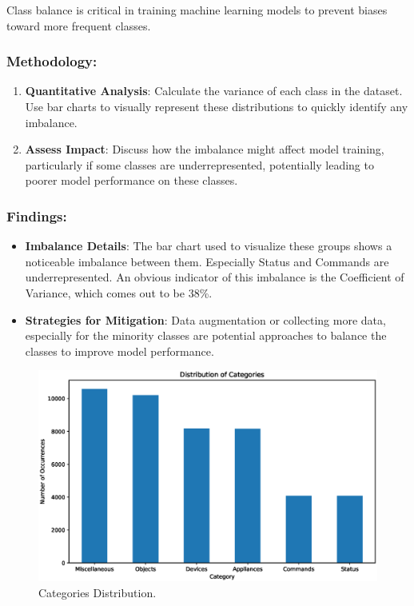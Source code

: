 Class balance is critical in training machine learning models to prevent biases toward more frequent classes.

\subsubsection{Methodology:}

\begin{enumerate}
    \item \textbf{Quantitative Analysis}: Calculate the variance of each class in the dataset. Use bar charts to visually represent these distributions to quickly identify any imbalance.
    \item \textbf{Assess Impact}: Discuss how the imbalance might affect model training, particularly if some classes are underrepresented, potentially leading to poorer model performance on these classes.
\end{enumerate}

\subsubsection{Findings:}

\begin{itemize}
    \item \textbf{Imbalance Details}: The bar chart used to visualize these groups shows a noticeable imbalance between them. Especially Status and Commands are underrepresented. An obvious indicator of this imbalance is the Coefficient of Variance, which comes out to be 38\%.
    \item \textbf{Strategies for Mitigation}: Data augmentation or collecting more data, especially for the minority classes are potential approaches to balance the classes to improve model performance.
\end{itemize}

\begin{figure}[!ht]
	\centering
	\includegraphics[scale=0.3]{fig/categories_dist}
	\vspace{-0.3cm}
	\caption{Categories Distribution.}
	\label{fig:CategoriesDistribution}
	\vspace{-0.1cm}
\end{figure}